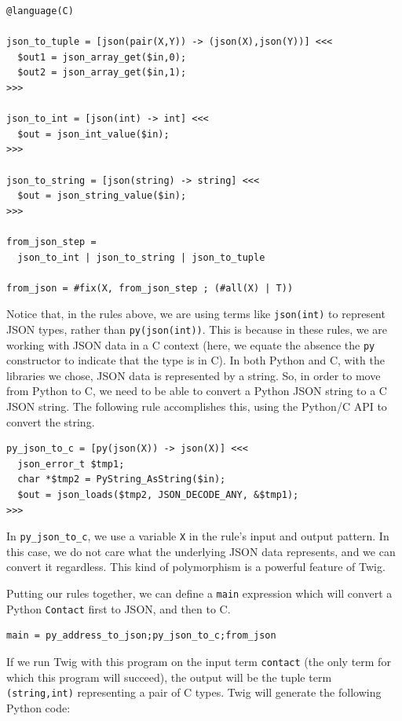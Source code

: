 \begin{verbatim}
@language(C)

json_to_tuple = [json(pair(X,Y)) -> (json(X),json(Y))] <<<
  $out1 = json_array_get($in,0);
  $out2 = json_array_get($in,1);
>>>

json_to_int = [json(int) -> int] <<<
  $out = json_int_value($in);
>>>

json_to_string = [json(string) -> string] <<<
  $out = json_string_value($in);
>>>

from_json_step = 
  json_to_int | json_to_string | json_to_tuple

from_json = #fix(X, from_json_step ; (#all(X) | T))
\end{verbatim}

Notice that, in the rules above, we are using terms like
\texttt{json(int)} to represent JSON types, rather than
\texttt{py(json(int))}. This is because in these rules, we are
working with JSON data in a C context (here, we equate the absence
the \texttt{py} constructor to indicate that the type is in C). In
both Python and C, with the libraries we chose, JSON data is
represented by a string. So, in order to move from Python to C, we
need to be able to convert a Python JSON string to a C JSON
string. The following rule accomplishes this, using the Python/C
API to convert the string.

\begin{verbatim}
py_json_to_c = [py(json(X)) -> json(X)] <<<
  json_error_t $tmp1;
  char *$tmp2 = PyString_AsString($in);
  $out = json_loads($tmp2, JSON_DECODE_ANY, &$tmp1);
>>>
\end{verbatim}

In \texttt{py\_json\_to\_c}, we use a variable \texttt{X} in the
rule's input and output pattern. In this case, we do not care what
the underlying JSON data represents, and we can convert it
regardless. This kind of polymorphism is a powerful feature of
Twig.

Putting our rules together, we can define a \texttt{main}
expression which will convert a Python \texttt{Contact} first to
JSON, and then to C.

\begin{verbatim}
main = py_address_to_json;py_json_to_c;from_json
\end{verbatim}

If we run Twig with this program on the input term
\texttt{contact} (the only term for which this program will
succeed), the output will be the tuple term \texttt{(string,int)}
representing a pair of C types. Twig will generate the following
Python code:

